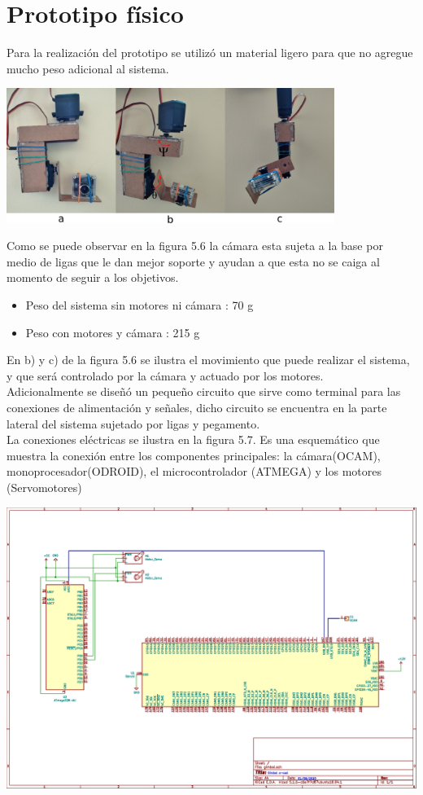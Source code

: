 \section{Prototipo físico}
Para la realización del prototipo se utilizó un material ligero para que no agregue mucho peso adicional al sistema.
\begin{center}
	\includegraphics[width=0.8\textwidth]{Contenido/Cuerpo/Capitulo5/Fig17.eps}
	\label{Fig1}
\end{center}
Como se puede observar en la figura 5.6 la cámara esta sujeta a la base por medio de ligas que le dan mejor soporte y ayudan a que
esta no se caiga al momento de seguir a los objetivos.
\begin{itemize}
	\item Peso del sistema sin motores ni cámara : 70 g
	\item Peso con motores y cámara : 215 g
\end{itemize}
En b) y c) de la figura 5.6 se ilustra el movimiento que puede realizar el sistema, y que será controlado
por la cámara y actuado por los motores.\\
Adicionalmente se diseñó un pequeño circuito que sirve como terminal para las conexiones de alimentación y señales,
dicho circuito se encuentra en la parte lateral del sistema sujetado por ligas y pegamento.\\
La conexiones eléctricas se ilustra en la figura 5.7. Es una esquemático que muestra la conexión entre los componentes principales: la cámara(OCAM), monoprocesador(ODROID),
el microcontrolador (ATMEGA) y los motores (Servomotores)
\begin{center}
	\includegraphics[width=1.0\textwidth]{Contenido/Cuerpo/Capitulo5/Fig21.eps}
	\label{Fig1}
\end{center}


